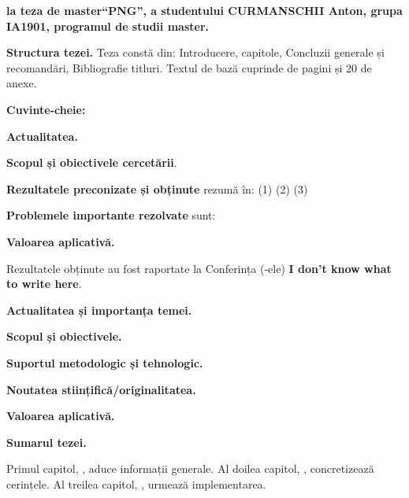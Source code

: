 \documentclass[a4paper,12pt]{report}
\newcommand{\authorName}{CURMANSCHII Anton}
\newcommand{\thesisTitle}{PNG}
\newcommand{\uniGroupName}{IA1901}
\newcommand{\thesisType}{master}
\newcommand{\programulDeStudii}{master}
\newcommand{\anexeCount}{20}
\newcommand{\conferencesList}{I don't know what to write here}
\begin{document}


\clearpage
\tableofcontents

\clearpage
{}
\begin{acronym}

\end{acronym}


\clearpage
{}

\textbf{la teza de \thesisType ``\thesisTitle'', a studentului \authorName{}, grupa \uniGroupName{}, programul de studii \programulDeStudii.}

\textbf{Structura tezei.}
Teza constă din: Introducere,  capitole, Concluzii generale și recomandări, Bibliografie \bibliographyEntryCount{} titluri.
Textul de bază cuprinde \usefulPageCount{} de pagini și \anexeCount{} de anexe.

\textbf{Cuvinte-cheie:}

\textbf{Actualitatea.}

\textbf{Scopul și obiectivele cercetării}.

\textbf{Rezultatele preconizate și obținute} rezumă în: (1) (2) (3)

\textbf{Problemele importante rezolvate} sunt:

\textbf{Valoarea aplicativă.}

Rezultatele obținute au fost raportate la Conferința (-ele) \textbf{\conferencesList}.



\textbf{Actualitatea și importanța temei.}

\textbf{Scopul și obiectivele.}

\textbf{Suportul metodologic și tehnologic.}

\textbf{Noutatea stiințifică/originalitatea.}

\textbf{Valoarea aplicativă.}

\textbf{Sumarul tezei.}

Primul capitol, , aduce informații generale.
Al doilea capitol, , concretizează cerințele.
Al treilea capitol, , urmează implementarea.
\end{document}
